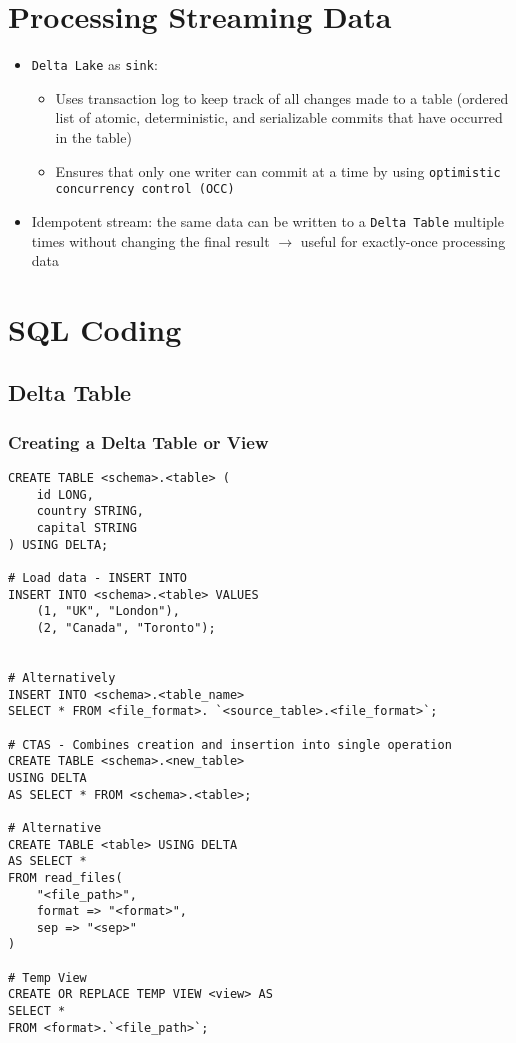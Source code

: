 \documentclass[11pt]{scrartcl}
\begin{document}
\section{Processing Streaming Data}
\begin{itemize}
	\item \texttt{Delta Lake} as \texttt{sink}:
	\begin{itemize}
		\item Uses transaction log to keep track of all changes made to a table (ordered list of atomic, deterministic, and serializable commits that have occurred in the table)
		\item Ensures that only one writer can commit at a time by using \texttt{optimistic concurrency control (OCC)}
	\end{itemize}
	\item Idempotent stream: the same data can be written to a \texttt{Delta Table} multiple times without changing the final result $\to$ useful for exactly-once processing data
\end{itemize}


\newpage
\section{SQL Coding}
\subsection{Delta Table} \label{delta_table_sql} 
\subsubsection{Creating a Delta Table or View} 
\begin{lstlisting}
CREATE TABLE <schema>.<table> (
	id LONG,
	country STRING,
	capital STRING
) USING DELTA;

# Load data - INSERT INTO
INSERT INTO <schema>.<table> VALUES
	(1, "UK", "London"),
	(2, "Canada", "Toronto");


# Alternatively
INSERT INTO <schema>.<table_name>
SELECT * FROM <file_format>. `<source_table>.<file_format>`;

# CTAS - Combines creation and insertion into single operation
CREATE TABLE <schema>.<new_table> 
USING DELTA
AS SELECT * FROM <schema>.<table>;

# Alternative
CREATE TABLE <table> USING DELTA
AS SELECT *
FROM read_files(
	"<file_path>",
	format => "<format>",
	sep => "<sep>"
)

# Temp View
CREATE OR REPLACE TEMP VIEW <view> AS
SELECT *
FROM <format>.`<file_path>`;
\end{lstlisting}
\end{document}
